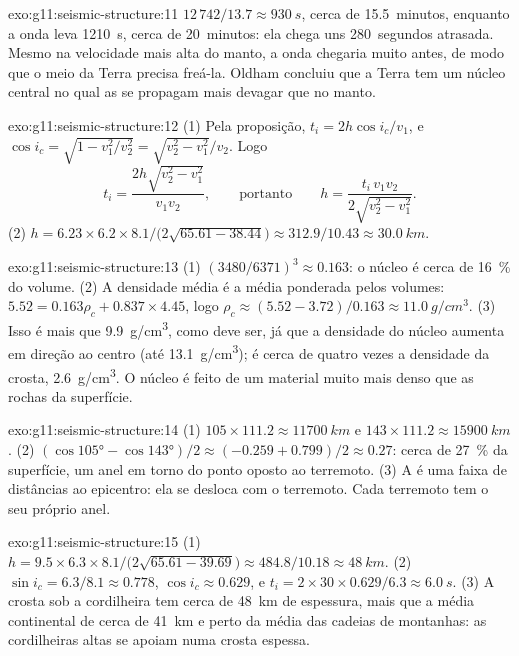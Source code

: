 \begin{solution}{exo:g11:seismic-structure:11}
$12\,742/13.7 \approx \qty{930}{s}$, cerca de 15.5~minutos, enquanto a onda
leva \qty{1210}{s}, cerca de 20~minutos: ela chega uns 280~segundos
atrasada. Mesmo na velocidade mais alta do manto, a onda chegaria muito
antes, de modo que o meio da Terra precisa freá-la. Oldham concluiu que a
Terra tem um núcleo central no qual as  se propagam mais devagar que
no manto.
\end{solution}

\begin{solution}{exo:g11:seismic-structure:12}
(1) Pela proposição, $t_i = 2h\cos i_c/v_1$, e $\cos i_c = \sqrt{1 -
v_1^2/v_2^2} = \sqrt{v_2^2 - v_1^2}/v_2$. Logo
\[
  t_i = \frac{2h\sqrt{v_2^2 - v_1^2}}{v_1 v_2},
  \qquad\text{portanto}\qquad
  h = \frac{t_i\,v_1 v_2}{2\sqrt{v_2^2 - v_1^2}}.
\]
(2) $h = 6.23 \times 6.2 \times 8.1/\bigl(2\sqrt{65.61 -
38.44}\bigr) \approx 312.9/10.43 \approx \qty{30.0}{km}$.
\end{solution}

\begin{solution}{exo:g11:seismic-structure:13}
(1) $(3480/6371)^3 \approx 0.163$: o núcleo é cerca de \qty{16}{\percent} do
volume. (2) A densidade média é a média ponderada pelos volumes: $5.52 = 0.163
\rho_c + 0.837 \times 4.45$, logo $\rho_c \approx (5.52 - 3.72)/0.163 \approx
\qty{11.0}{g/cm^3}$. (3) Isso é mais que \qty{9.9}{g/cm^3}, como deve ser,
já que a densidade do núcleo aumenta em direção ao centro (até
\qty{13.1}{g/cm^3}); é cerca de quatro vezes a densidade da crosta,
\qty{2.6}{g/cm^3}. O núcleo é feito de um material muito mais denso que as
rochas da superfície.
\end{solution}

\begin{solution}{exo:g11:seismic-structure:14}
(1) $105 \times 111.2 \approx \qty{11700}{km}$ e $143 \times 111.2 \approx
\qty{15900}{km}$. (2) $(\cos\ang{105} - \cos\ang{143})/2 \approx (-0.259 +
0.799)/2 \approx 0.27$: cerca de \qty{27}{\percent} da superfície, um anel
em torno do ponto oposto ao terremoto. (3) A  é uma faixa de
distâncias ao epicentro: ela se desloca com o terremoto. Cada terremoto tem
o seu próprio anel.
\end{solution}

\begin{solution}{exo:g11:seismic-structure:15}
(1) $h = 9.5 \times 6.3 \times 8.1/\bigl(2\sqrt{65.61 - 39.69}\bigr) \approx
484.8/10.18 \approx \qty{48}{km}$. (2) $\sin i_c = 6.3/8.1 \approx 0.778$,
$\cos i_c \approx 0.629$, e $t_i = 2 \times 30 \times 0.629/6.3 \approx
\qty{6.0}{s}$. (3) A crosta sob a cordilheira tem cerca de \qty{48}{km} de
espessura, mais que a média continental de cerca de \qty{41}{km} e perto da
média das cadeias de montanhas: as cordilheiras altas se apoiam numa crosta
espessa.
\end{solution}

